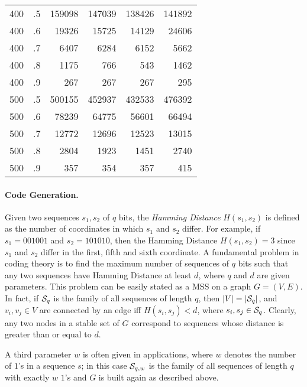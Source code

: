 \begin{table}
\begin{center}
\begin{tabular}{||c|r|r|r|r|r|}
    400       & .5      &159098    &147039  &138426  &141892     \\ 
    400       & .6      &19326     &15725   &14129   &24606      \\ 
    400       & .7      &6407      &6284    &6152    &5662       \\ 
    400       & .8      &1175      &766     &543     &1462       \\ 
    400       & .9      &267       &267     &267     &295        \\ 
\hline
    500       & .5      &500155    &452937  &432533  &476392     \\ 
    500       & .6      &78239     &64775   &56601   &66494      \\ 
    500       & .7      &12772     &12696   &12523   &13015      \\ 
    500       & .8      &2804      &1923    &1451    &2740       \\ 
    500       & .9      &357       &354     &357     &415        \\ 
\hline 
\end{tabular}
\end{center}
\end{table}
\paragraph{Code Generation.} Given two sequences $s_1,s_2$ of $q$
bits, the {\it Hamming Distance} $H(s_1,s_2)$ is defined as the
number of coordinates in which $s_1$ and $s_2$ differ. For example,
if $s_1=001001$ and $s_2=101010$, then the Hamming Distance
$H(s_1,s_2)=3$ since $s_1$ and $s_2$ differ in the first, fifth and
sixth coordinate. A fundamental problem in coding theory is to
find the maximum number of sequences of $q$ bits such that any two
sequences have Hamming Distance at least $d$, where $q$
and $d$ are given parameters. This problem can be easily stated as a
MSS on a graph $G=(V,E)$. In fact, if ${\cal S}_q$ is the family of
all sequences of length $q$,  then $|V| = |{\cal S}_q|$, and $v_i,v_j
\in V$ are connected by an edge iff $H(s_i,s_j) < d$, where $s_i,s_j
\in {\cal S}_q$. Clearly, any two nodes in a stable set of $G$
correspond to sequences whose distance is greater than or equal to
$d$. 

A third parameter $w$ is
often given in applications, where $w$ denotes the number of
$1$'s  in a sequence $s$; in this case ${\cal S}_{q,w}$ is the
family of all sequences of length $q$ with exactly $w$ $1$'s and
$G$ is built again as described above. 

